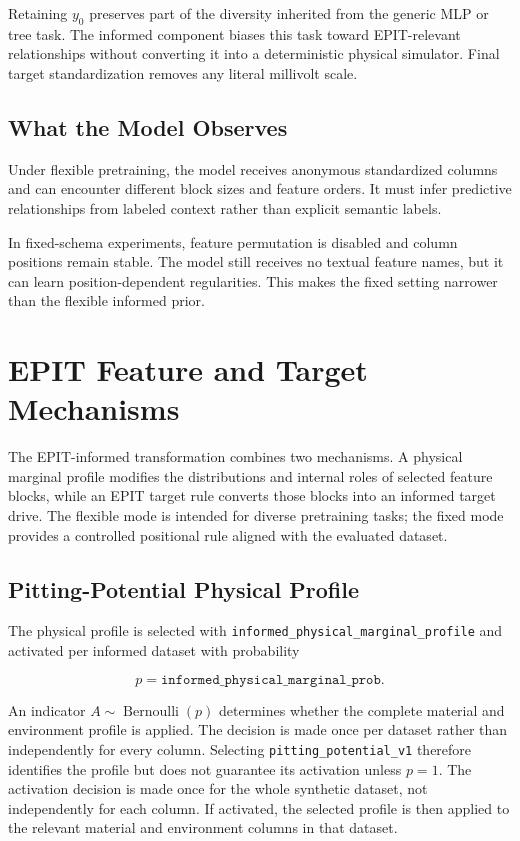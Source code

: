 \documentclass{article}
\begin{document}
Retaining \(y_0\) preserves part of the diversity inherited from the generic MLP or tree task. The informed component biases this task toward EPIT-relevant relationships without converting it into a deterministic physical simulator. Final target standardization removes any literal millivolt scale.

\subsection{What the Model Observes}

Under flexible pretraining, the model receives anonymous standardized columns and can encounter different block sizes and feature orders. It must infer predictive relationships from labeled context rather than explicit semantic labels.

In fixed-schema experiments, feature permutation is disabled and column positions remain stable. The model still receives no textual feature names, but it can learn position-dependent regularities. This makes the fixed setting narrower than the flexible informed prior.

\section{EPIT Feature and Target Mechanisms}
\label{sec:epit-mechanisms}

The EPIT-informed transformation combines two mechanisms. A physical marginal profile modifies the distributions and internal roles of selected feature blocks, while an EPIT target rule converts those blocks into an informed target drive. The flexible mode is intended for diverse pretraining tasks; the fixed mode provides a controlled positional rule aligned with the evaluated dataset.

\subsection{Pitting-Potential Physical Profile}

The physical profile is selected with
\texttt{informed\_physical\_marginal\_profile} and activated per informed dataset with probability

\[
p=\texttt{informed\_physical\_marginal\_prob}.
\]

An indicator \(A\sim\operatorname{Bernoulli}(p)\) determines whether the complete material and environment profile is applied. The decision is made once per dataset rather than independently for every column. Selecting \texttt{pitting\_potential\_v1} therefore identifies the profile but does not guarantee its activation unless \(p=1\).
The activation decision is made once for the whole synthetic dataset, not
independently for each column. If activated, the selected profile is then applied
to the relevant material and environment columns in that dataset.
\end{document}
